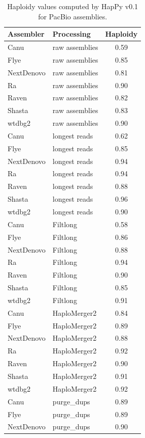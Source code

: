 \begin{suppsection}
\begin{table}[ht]
\centering
\caption{Haploidy values computed by HapPy v0.1 for PacBio assemblies.}
\begin{adjustbox}{totalheight=\baselineskip}
\begin{tabular}{llc}
\hline
\textbf{Assembler} & \textbf{Processing} & \textbf{Haploidy} \\
\hline
Canu & raw assemblies & 0.59 \\
Flye & raw assemblies & 0.85 \\
NextDenovo & raw assemblies & 0.81 \\
Ra & raw assemblies & 0.90 \\
Raven & raw assemblies & 0.82 \\
Shasta & raw assemblies & 0.83 \\
wtdbg2 & raw assemblies & 0.90 \\
Canu & longest reads & 0.62 \\
Flye & longest reads & 0.85 \\
NextDenovo & longest reads & 0.94 \\
Ra & longest reads & 0.94 \\
Raven & longest reads & 0.88 \\
Shasta & longest reads & 0.96 \\
wtdbg2 & longest reads & 0.90 \\
Canu & Filtlong & 0.58 \\
Flye & Filtlong & 0.86 \\
NextDenovo & Filtlong & 0.88 \\
Ra & Filtlong & 0.94 \\
Raven & Filtlong & 0.90 \\
Shasta & Filtlong & 0.85 \\
wtdbg2 & Filtlong & 0.91 \\
Canu & HaploMerger2 & 0.84 \\
Flye & HaploMerger2 & 0.89 \\
NextDenovo & HaploMerger2 & 0.88 \\
Ra & HaploMerger2 & 0.92 \\
Raven & HaploMerger2 & 0.90 \\
Shasta & HaploMerger2 & 0.91 \\
wtdbg2 & HaploMerger2 & 0.92 \\
Canu & purge\_dups & 0.89 \\
Flye & purge\_dups & 0.89 \\
NextDenovo & purge\_dups & 0.90 \\

\end{tabular}
\end{adjustbox}
\end{table}
\end{suppsection}
